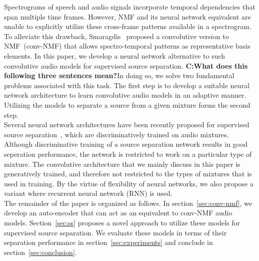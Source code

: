\documentclass{article}
\begin{document}
Spectrograms of speech and audio signals incorporate temporal dependencies that span multiple time frames. However, NMF and its neural network equivalent are unable to explicitly utilize these cross-frame patterns available in a spectrogram. To alleviate this drawback, Smaragdis~\cite{smaragdis2007convolutive} proposed a convolutive version to NMF~(conv-NMF) that allows spectro-temporal patterns as representative basis elements. In this paper, we develop a neural network alternative to such convolutive audio models for supervised source separation. \textbf{C:What does this following three sentences mean?}In doing so, we solve two fundamental problems associated with this task. The first step is to develop a suitable neural network architecture to learn convolutive audio models in an adaptive manner. Utilizing the models to separate a source from a given mixture forms the second step. \\

Several neural network architectures have been recently proposed for supervised source separation~\cite{grais2017single, venkataramani2017end}, which are discriminatively trained on audio mixtures. Although discriminative training of a source separation network results in good seperation performance, the network is restricted to work on a particular type of mixture. The convolutive architecture that we mainly discuss in this paper is generatively trained, and therefore not restricted to the types of mixtures that is used in training. By the virtue of flexibility of neural networks, we also propose a variant where recurrent neural network (RNN) is used. \\

The remainder of the paper is organized as follows. In section~\ref{sec:conv-nmf}, we develop an auto-encoder that can act as an equivalent to conv-NMF audio models. Section~\ref{sec:ss} proposes a novel approach to utilize these models for supervised source separation. We evaluate these models in terms of their separation performance in section~\ref{sec:experiments} and conclude in section~\ref{sec:conclusion}. \\
\end{document}
